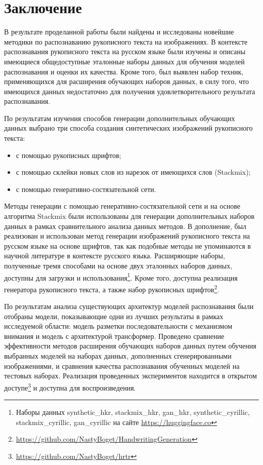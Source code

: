 \section{Заключение}
\label{sec:Chapter5} 

В результате проделанной работы были найдены и исследованы новейшие методики по распознаванию рукописного текста на изображениях.
В контексте распознавания рукописного текста на русском языке были изучены и описаны имеющиеся общедоступные эталонные наборы данных
для обучения моделей распознавания и оценки их качества.
Кроме того, был выявлен набор техник, применяющихся для расширения обучающих наборов данных,
в силу того, что имеющихся данных недостаточно для получения удовлетворительного результата распознавания.

По результатам изучения способов генерации дополнительных обучающих данных выбрано три способа создания синтетических изображений рукописного текста:
\begin{itemize}
    \item с помощью рукописных шрифтов;
    \item с помощью склейки новых слов из нарезок от имеющихся слов (Stackmix);
    \item с помощью генеративно-состязательной сети.
\end{itemize}

Методы генерации с помощью генеративно-состязательной сети и на основе алгоритма Stackmix были использованы для генерации
дополнительных наборов данных в рамках сравнительного анализа данных методов.
В дополнение, был реализован и использован метод генерации изображений рукописного текста на русском языке на основе шрифтов,
так как подобные методы не упоминаются в научной литературе в контексте русского языка.
Расширяющие наборы, полученные тремя способами на основе двух эталонных наборов данных, доступны для загрузки
и использования\footnote{Наборы данных synthetic\_hkr, stackmix\_hkr, gan\_hkr, synthetic\_cyrillic, stackmix\_cyrillic, gan\_cyrillic на сайте \url{https://huggingface.co}}.
Кроме того, доступна реализация генератора рукописного текста, а также набор рукописных шрифтов\footnote{\url{https://github.com/NastyBoget/HandwritingGeneration}}.

По результатам анализа существующих архитектур моделей распознавания были отобраны модели, показывающие одни из лучших
результаты в рамках исследуемой области: модель разметки последовательности с механизмом внимания и модель с архитектурой трансформер.
Проведено сравнение эффективности методов расширения обучающих наборов данных путем обучения выбранных моделей
на наборах данных, дополненных сгенерированными изображениями, и сравнения качества распознавания обученных моделей на тестовых наборах.
Реализация проведенных экспериментов находится в открытом доступе\footnote{\url{https://github.com/NastyBoget/hrtr}} и доступна для воспроизведения.

